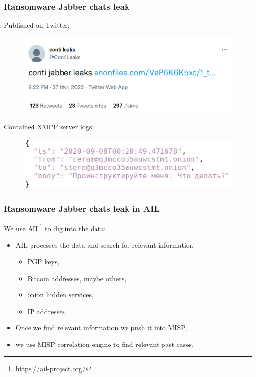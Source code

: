 \begin{frame}[fragile]
    \frametitle{Ransomware Jabber chats leak}
    Published on Twitter:
    \begin{figure}[t]
        \includegraphics[width=.8\textwidth]{pictures/contileaks-twitter.png}
        \centering
    \end{figure}

    Contained XMPP server logs:
    \begin{figure}[t]
        \includegraphics[width=.6\textwidth]{pictures/contileaks-json.png}
        \centering
    \end{figure}
\end{frame}

\begin{frame}
    \frametitle{Ransomware Jabber chats leak in AIL}
    We use AIL\footnote{\url{https://ail-project.org/}} to dig into the data:
    \begin{itemize}
        \item AIL processes the data and search for relevant information
        \begin{itemize}
        \item PGP keys,
        \item Bitcoin addresses, maybe others,
        \item onion hidden services,
        \item IP addresses.
        \end{itemize}
    \item Once we find relevant information we push it into MISP,
    \item we use MISP correlation engine to find relevant past cases.
    \end{itemize}

\end{frame}

